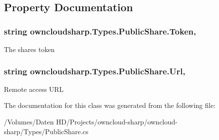 \subsection{Property Documentation}
\hypertarget{classowncloudsharp_1_1_types_1_1_public_share_a59e47ec6de51eb32aedba520e5fb5e49}{}
\subsubsection[{Token}]{\setlength{\rightskip}{0pt plus 5cm}string owncloudsharp.\+Types.\+Public\+Share.\+Token\hspace{0.3cm}{\ttfamily [get]}, {\ttfamily [set]}}\label{classowncloudsharp_1_1_types_1_1_public_share_a59e47ec6de51eb32aedba520e5fb5e49}


The shares token 

\hypertarget{classowncloudsharp_1_1_types_1_1_public_share_a25d939622a2d70b31a7885cfc4e9fe73}{}
\subsubsection[{Url}]{\setlength{\rightskip}{0pt plus 5cm}string owncloudsharp.\+Types.\+Public\+Share.\+Url\hspace{0.3cm}{\ttfamily [get]}, {\ttfamily [set]}}\label{classowncloudsharp_1_1_types_1_1_public_share_a25d939622a2d70b31a7885cfc4e9fe73}


Remote access U\+R\+L 



The documentation for this class was generated from the following file\+:\begin{DoxyCompactItemize}
\item 
/\+Volumes/\+Daten H\+D/\+Projects/owncloud-\/sharp/owncloud-\/sharp/\+Types/Public\+Share.\+cs\end{DoxyCompactItemize}
